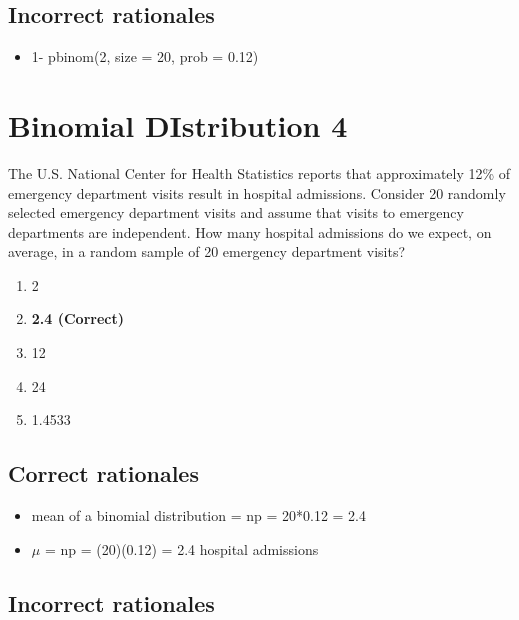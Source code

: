 \documentclass[letterpaper,9pt,twoside,printwatermark=false]{pinp}
\providecommand{\tightlist}{%
  \setlength{\itemsep}{0pt}\setlength{\parskip}{0pt}}
\begin{document}
\hypertarget{incorrect-rationales-9}{%
\subsection{Incorrect rationales}\label{incorrect-rationales-9}}

\begin{itemize}
\tightlist
\item
  1- pbinom(2, size = 20, prob = 0.12)
\end{itemize}

\hypertarget{binomial-distribution-4}{%
\section{Binomial DIstribution 4}\label{binomial-distribution-4}}

The U.S. National Center for Health Statistics reports that
approximately 12\% of emergency department visits result in hospital
admissions. Consider 20 randomly selected emergency department visits
and assume that visits to emergency departments are independent. How
many hospital admissions do we expect, on average, in a random sample of
20 emergency department visits?

\begin{enumerate}
\def\labelenumi{\alph{enumi}.}
\tightlist
\item
  2
\item
  \textbf{2.4 (Correct)}
\item
  12
\item
  24
\item
  1.4533
\end{enumerate}

\hypertarget{correct-rationales-10}{%
\subsection{Correct rationales}\label{correct-rationales-10}}

\begin{itemize}
\tightlist
\item
  mean of a binomial distribution = np = 20*0.12 = 2.4
\item
  \(\mu\) = np = (20)(0.12) = 2.4 hospital admissions
\end{itemize}

\hypertarget{incorrect-rationales-10}{%
\subsection{Incorrect rationales}\label{incorrect-rationales-10}}
\end{document}
